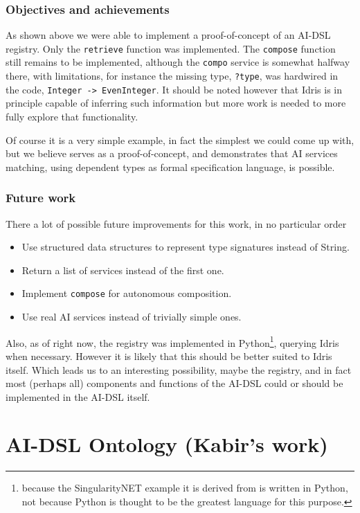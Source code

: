 \documentclass[]{report}
\begin{document}
\subsection{Objectives and achievements}

As shown above we were able to implement a proof-of-concept of an
AI-DSL registry.  Only the \texttt{retrieve} function was implemented.
The \texttt{compose} function still remains to be implemented,
although the \texttt{compo} service is somewhat halfway there, with
limitations, for instance the missing type, \texttt{?type}, was
hardwired in the code, \texttt{Integer -> EvenInteger}.  It should be
noted however that Idris is in principle capable of inferring such
information but more work is needed to more fully explore that
functionality.

Of course it is a very simple example, in fact the simplest we could
come up with, but we believe serves as a proof-of-concept, and
demonstrates that AI services matching, using dependent types as
formal specification language, is possible.

\subsection{Future work}

There a lot of possible future improvements for this work, in no
particular order
\begin{itemize}
\item Use structured data structures to represent type signatures
  instead of String.
\item Return a list of services instead of the first one.
\item Implement \texttt{compose} for autonomous composition.
\item Use real AI services instead of trivially simple ones.
\end{itemize}

Also, as of right now, the registry was implemented in
Python\footnote{because the SingularityNET example it is derived from
is written in Python, not because Python is thought to be the greatest
language for this purpose.}, querying Idris when necessary.  However
it is likely that this should be better suited to Idris itself.  Which
leads us to an interesting possibility, maybe the registry, and in
fact most (perhaps all) components and functions of the AI-DSL could
or should be implemented in the AI-DSL itself.

\chapter{AI-DSL Ontology (Kabir's work)}
\end{document}
